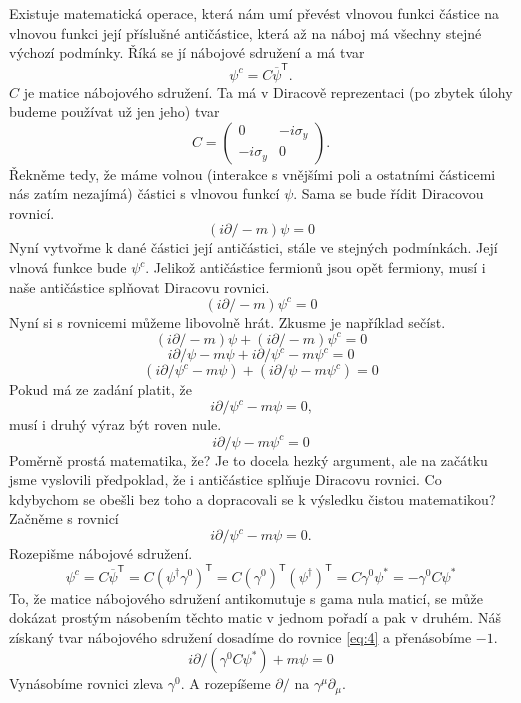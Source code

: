 \documentclass{../../../../style/mkimain}
\begin{document}
\begin{enumerate}
    Existuje matematická operace, která nám umí převést vlnovou funkci částice na vlnovou funkci její příslušné antičástice, která až na náboj má všechny stejné výchozí podmínky. Říká se jí nábojové sdružení a má tvar
    $$\psi ^c=C\overline{\psi}^\mathsf{T}\text{.}$$
    $C$ je matice nábojového sdružení. Ta má v Diracově reprezentaci (po zbytek úlohy budeme používat už jen jeho) tvar
    $$C=\begin{pmatrix}
        0 & -i\sigma_y\\
        -i\sigma_y & 0
    \end{pmatrix} \text{.}$$
    Řekněme tedy, že máme volnou (interakce s vnějšími poli a ostatními částicemi nás zatím nezajímá) částici s vlnovou funkcí $\psi$. Sama se bude řídit Diracovou rovnicí. 
 $$\left(i\partial\!\!\!/-m\right)\psi=0$$
Nyní vytvořme k dané částici její antičástici, stále ve stejných podmínkách. Její vlnová funkce bude $\psi^c$. Jelikož antičástice fermionů jsou opět fermiony, musí i naše antičástice splňovat Diracovu rovnici.
$$\left(i\partial\!\!\!/-m\right)\psi^c=0$$
Nyní si s rovnicemi můžeme libovolně hrát. Zkusme je například sečíst.
$$\left(i\partial\!\!\!/-m\right)\psi+\left(i\partial\!\!\!/-m\right)\psi^c=0$$
$$i\partial\!\!\!/\psi-m\psi+i\partial\!\!\!/\psi^c-m\psi^c=0$$
$$\left(i\partial\!\!\!/\psi^c-m\psi\right)+\left(i\partial\!\!\!/\psi-m\psi^c\right)=0$$
Pokud má ze zadání platit, že
    $$i\partial\!\!\!/\psi^c-m\psi=0\text{,}$$
musí i druhý výraz být roven nule.
$$i\partial\!\!\!/\psi-m\psi^c=0$$
Poměrně prostá matematika, že? Je to docela hezký argument, ale na začátku jsme vyslovili předpoklad, že i antičástice splňuje Diracovu rovnici. Co kdybychom se obešli bez toho a dopracovali se k výsledku čistou matematikou?
Začněme s rovnicí
     \begin{equation}\label{eq:4}
    i\partial\!\!\!/\psi^c-m\psi=0\text{.}
    \end{equation}
    Rozepišme nábojové sdružení.
$$\psi^c=C\overline{\psi}^\mathsf{T}=C\left(\psi^\dagger\gamma^0\right)^\mathsf{T}=C\left(\gamma^0\right)^\mathsf{T}\left(\psi^\dagger\right)^\mathsf{T}=C\gamma^0\psi^*=-\gamma^0C\psi^*$$    
To, že matice nábojového sdružení antikomutuje s gama nula maticí, se může dokázat prostým násobením těchto matic v jednom pořadí a pak v druhém. Náš získaný tvar nábojového sdružení dosadíme do rovnice \ref{eq:4} a přenásobíme $-1$.
$$i\partial\!\!\!/\left(\gamma^0C\psi^*\right)+m\psi=0$$
Vynásobíme rovnici zleva $\gamma^0$. A rozepíšeme $\partial\!\!\!/$ na $\gamma ^\mu \partial_\mu$.


\end{enumerate}
\end{document}
